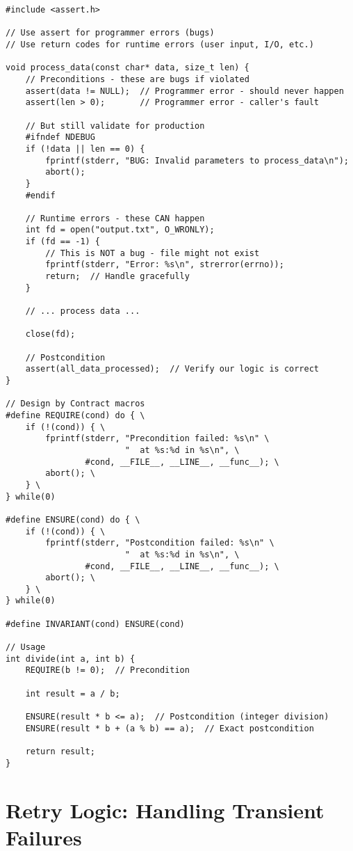 \begin{lstlisting}
#include <assert.h>

// Use assert for programmer errors (bugs)
// Use return codes for runtime errors (user input, I/O, etc.)

void process_data(const char* data, size_t len) {
    // Preconditions - these are bugs if violated
    assert(data != NULL);  // Programmer error - should never happen
    assert(len > 0);       // Programmer error - caller's fault

    // But still validate for production
    #ifndef NDEBUG
    if (!data || len == 0) {
        fprintf(stderr, "BUG: Invalid parameters to process_data\n");
        abort();
    }
    #endif

    // Runtime errors - these CAN happen
    int fd = open("output.txt", O_WRONLY);
    if (fd == -1) {
        // This is NOT a bug - file might not exist
        fprintf(stderr, "Error: %s\n", strerror(errno));
        return;  // Handle gracefully
    }

    // ... process data ...

    close(fd);

    // Postcondition
    assert(all_data_processed);  // Verify our logic is correct
}

// Design by Contract macros
#define REQUIRE(cond) do { \
    if (!(cond)) { \
        fprintf(stderr, "Precondition failed: %s\n" \
                        "  at %s:%d in %s\n", \
                #cond, __FILE__, __LINE__, __func__); \
        abort(); \
    } \
} while(0)

#define ENSURE(cond) do { \
    if (!(cond)) { \
        fprintf(stderr, "Postcondition failed: %s\n" \
                        "  at %s:%d in %s\n", \
                #cond, __FILE__, __LINE__, __func__); \
        abort(); \
    } \
} while(0)

#define INVARIANT(cond) ENSURE(cond)

// Usage
int divide(int a, int b) {
    REQUIRE(b != 0);  // Precondition

    int result = a / b;

    ENSURE(result * b <= a);  // Postcondition (integer division)
    ENSURE(result * b + (a % b) == a);  // Exact postcondition

    return result;
}
\end{lstlisting}

\section{Retry Logic: Handling Transient Failures}


